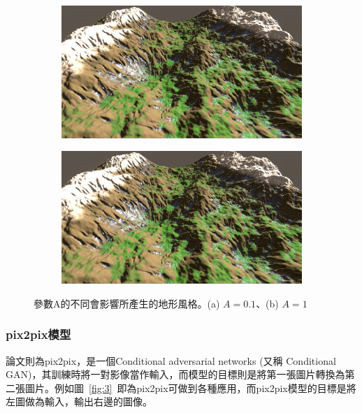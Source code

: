 \documentclass[a4paper, 12pt]{article}
\begin{document}
\begin{figure}[htbp]
    \begin{subfigure}{0.45\textwidth}
        \includegraphics[width=\linewidth]{fig/2a.jpg}
        \caption{} \label{fig:2a}
    \end{subfigure}%
    \hspace*{\fill}   %
    \begin{subfigure}{0.45\textwidth}
        \includegraphics[width=\linewidth]{fig/2a.jpg}
        \caption{} \label{fig:2b}
    \end{subfigure}%
    \caption{參數A的不同會影響所產生的地形風格。(a) $A = 0.1$、(b) $A = 1$} \label{fig:2}
\end{figure}

\subsubsection{pix2pix模型}
論文\cite{isola2017image}則為pix2pix，是一個Conditional adversarial networks (又稱 Conditional GAN)，其訓練時將一對影像當作輸入，而模型的目標則是將第一張圖片轉換為第二張圖片。例如圖~\ref{fig:3}~即為pix2pix可做到各種應用，而pix2pix模型的目標是將左圖做為輸入，輸出右邊的圖像。
\end{document}
